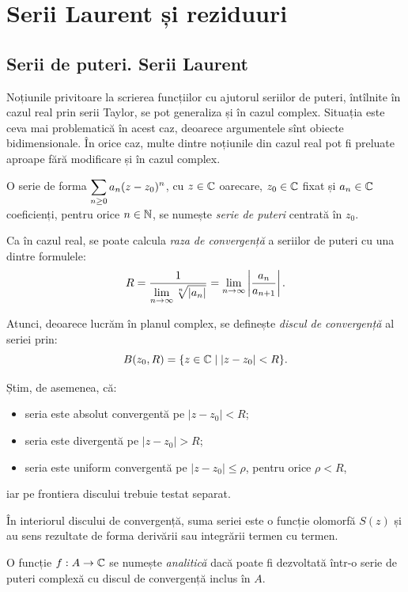 \chapter{Serii Laurent și reziduuri}

\section{Serii de puteri. Serii Laurent}

Noțiunile privitoare la scrierea funcțiilor cu ajutorul seriilor de puteri,
întîlnite în cazul real prin serii Taylor, se pot generaliza și în cazul
complex. Situația este ceva mai problematică în acest caz, deoarece
argumentele sînt obiecte bidimensionale. În orice caz, multe dintre noțiunile
din cazul real pot fi preluate aproape fără modificare și în cazul complex.

\begin{definition}\label{def:serie-cpx}
  O serie de forma $ \displaystyle\sum_{n \geq 0} a_n(z - z_0)^n $, cu $ z \in \mathbb{C} $
  oarecare, $ z_0 \in \mathbb{C} $ fixat și $ a_n \in \mathbb{C} $ coeficienți, pentru
  orice $ n \in \mathbb{N} $, se numește \emph{serie de puteri} centrată în $ z_0 $.
\end{definition}

Ca în cazul real, se poate calcula \emph{raza de convergență} a seriilor
de puteri cu una dintre formulele:
\[
  R = \dfrac{1}{\ds\lim_{n \to \infty} \sqrt[n]{|a_n|}} = %
  \lim_{n \to \infty} \left| \dfrac{a_n}{a_{n+1}} \right|.
\]

Atunci, deoarece lucrăm în planul complex, se definește \emph{discul de convergență}
al seriei prin:
\[
  B(z_0,R) = \{ z \in \mathbb{C} \mid | z - z_0| < R \}.
\]

Știm, de asemenea, că:
\begin{itemize}
\item seria este absolut convergentă pe $ |z - z_0| < R $;
\item seria este divergentă pe $ |z - z_0| > R $;
\item seria este uniform convergentă pe $ |z - z_0| \leq \rho $, pentru
  orice $ \rho < R $,
\end{itemize}
iar pe frontiera discului trebuie testat separat.

În interiorul discului de convergență, suma seriei este o funcție olomorfă $ S(z) $
și au sens rezultate de forma derivării sau integrării termen cu termen.

\begin{definition}\label{def:analitica}
  O funcție $ f : A \to \mathbb{C} $ se numește \emph{analitică} dacă poate fi
  dezvoltată într-o serie de puteri complexă cu discul de convergență
  inclus în $ A $.
\end{definition}

